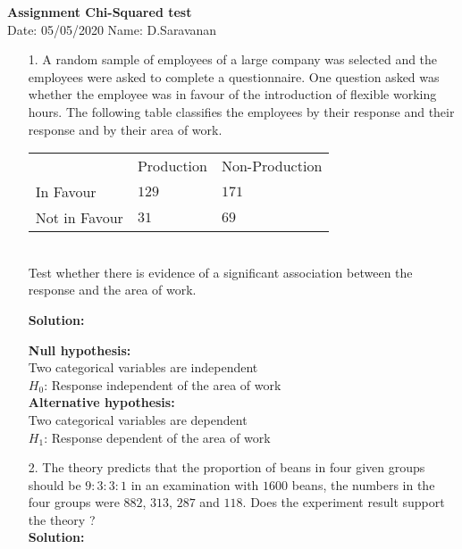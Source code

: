 \documentclass[a4paper,11pt,openright]{report}
\begin{document}
\singlespacing
\pagestyle{plain}

\begin{center}
\textbf{Assignment Chi-Squared test} \\
Date: 05/05/2020 \hspace{2mm} Name: D.Saravanan
\end{center}

\vspace{10px}

\begin{enumerate}

\item[1.] A random sample of employees of a large company was selected and the employees
were asked to complete a questionnaire. One question asked was whether the employee was in
favour of the introduction of flexible working hours. The following table classifies the
employees by their response and their response and by their area of work. \\

\begin{tabular}{lll}
		      & Production & Non-Production \\
In Favour     & $129$      & $171$ \\
Not in Favour & $31$       & $69$ \\
\end{tabular} \\

Test whether there is evidence of a significant association between the response and the
area of work.

\textbf{Solution:}

\textbf{Null hypothesis:} \\
Two categorical variables are independent \\
$H_{0}$: Response independent of the area of work \\

\textbf{Alternative hypothesis:} \\
Two categorical variables are dependent \\
$H_{1}$: Response dependent of the area of work \\


\item[2.] The theory predicts that the proportion of beans in four given groups should be
$9:3:3:1$ in an examination with $1600$ beans, the numbers in the four groups were $882$, 
$313$, $287$ and $118$. Does the experiment result support the theory ? \\ 

\textbf{Solution:}

\end{enumerate}
\end{document}
